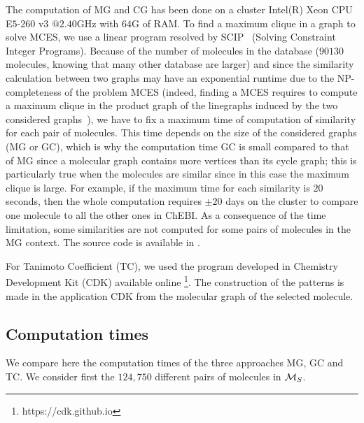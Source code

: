 \documentclass[10pt,letterpaper]{article}
\begin{document}
The computation of MG and CG has been done on a cluster Intel(R) Xeon CPU E$5$-$260$ v$3$ $@2.40$GHz with $64$G of RAM. To find a maximum clique in a graph to solve MCES, we use a linear program resolved by SCIP~\cite{scip} (Solving Constraint Integer Programs). Because of the number of molecules in the database ($90130$ molecules, knowing that many other database are larger) and since the similarity calculation between two graphs may have an exponential runtime due to the NP-completeness of the problem MCES (indeed, finding a MCES requires to compute a maximum clique in the product graph of the linegraphs induced by the two considered graphs~\cite{Raymond2002}), we have to fix a maximum time of computation of similarity for each pair of molecules. This time depends on the size of the considered graphs (MG or GC), which is why the computation time GC is small compared to that of MG since a molecular graph contains more vertices than its cycle graph; this is particularly true when the molecules are similar since in this case the maximum clique is large. For example, if the maximum time for each similarity is $20$ seconds, then the whole computation requires $\pm 20$ days on the cluster to compare one molecule to all the other ones in ChEBI. As a consequence of the time limitation, some similarities are not computed for some pairs of molecules in the MG context. The source code is available in .

For Tanimoto Coefficient (TC), we used the program developed in Chemistry Development Kit (CDK) available online \footnote{https://cdk.github.io}. The construction of the patterns is made in the application CDK from the molecular graph of the selected molecule.

\subsection*{Computation times}

We compare here the computation times of the three approaches MG, GC and TC. We consider first the  $124,750$ different pairs of molecules in  ${\cal M}_S$.

\end{document}
